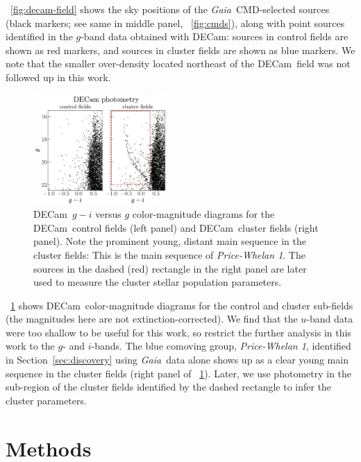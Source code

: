 \documentclass[twocolumn]{aastex62}
\newcommand{\gaia}{\textsl{Gaia}}
\newcommand{\decam}{DECam}
\newcommand{\sectionname}{Section}
\newcommand{\clustername}{\textsl{Price-Whelan 1}}
\begin{document}
\figurename~\ref{fig:decam-field} shows the sky positions of the \gaia\ CMD-selected sources (black markers; see same in middle panel, \figurename~\ref{fig:cmds}), along with point sources identified in the $g$-band data obtained with \decam: sources in control fields are shown as red markers, and sources in cluster fields are shown as blue markers.
We note that the smaller over-density located northeast of the \decam\ field was not followed up in this work.

\begin{figure}[t!]
\centering
\includegraphics[width=0.45\textwidth]{figures/DECam-cmd.pdf}
\caption{\decam\ $g-i$ versus $g$ color-magnitude diagrams for the \decam\ control fields (left panel) and \decam\ cluster fields (right panel).
Note the prominent young, distant main sequence in the cluster fields: This is the main sequence of \clustername.
The sources in the dashed (red) rectangle in the right panel are later used to measure the cluster stellar population parameters.
}
\label{fig:decam-cmd}
\end{figure}

\figurename~\ref{fig:decam-cmd} shows \decam\ color-magnitude diagrams for the control and cluster sub-fields (the magnitudes here are not extinction-corrected).
We find that the $u$-band data were too shallow to be useful for this work, so restrict the further analysis in this work to the $g$- and $i$-bands.
The blue comoving group, \clustername, identified in \sectionname~\ref{sec:discovery} using \gaia\ data alone shows up as a clear young main sequence in the cluster fields (right panel of \figurename~\ref{fig:decam-cmd}).
Later, we use photometry in the sub-region of the cluster fields identified by the dashed rectangle to infer the cluster parameters.


\section{Methods} \label{sec:methods}
\end{document}
